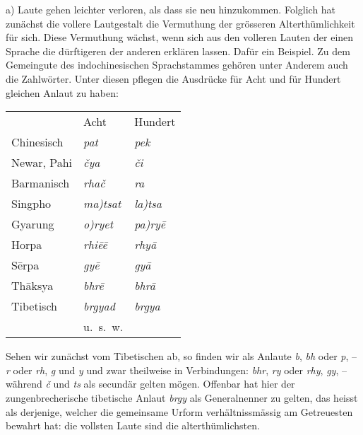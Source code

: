\largerpage[1]\label{III.I.I.2B1a}a) Laute gehen leichter verloren, als dass sie neu hinzukommen. Folglich hat zunächst die vollere Lautgestalt die Vermuthung der grösseren Alterthümlichkeit für sich. Diese Vermuthung wächst, wenn sich aus den volleren Lauten der einen Sprache die dürftigeren der anderen erklären lassen. Dafür ein Beispiel. \label{sp.157} Zu dem Gemeingute des indochine\label{fp.167}sischen Sprachstammes gehören unter Anderem auch die Zahlwörter. Unter diesen pflegen die Ausdrücke für Acht und für Hundert gleichen Anlaut zu haben:

\begin{table}[h]
\centering
\begin{tabular}{ l l l}
 & Acht & Hundert \\
Chinesisch & \textit{pat} & \textit{pek} \\
Newar, Pahi & \textit{čya} & \textit{či} \\
Barmanisch & \textit{rhač} & \textit{ra} \\
Singpho & \textit{ma)tsat} & \textit{la)tsa} \\
Gyarung & \textit{o)ryet} & \textit{pa)ryē} \\
Horpa & \textit{rhiēē} & \textit{rhyā} \\
Sērpa & \textit{gyē} & \textit{gyā} \\
Thāksya & \textit{bhrē} & \textit{bhrā} \\
Tibetisch & \textit{brgyad} & \textit{brgya} \\
 & u.~s.~w. & \\
\end{tabular}
\end{table}

\noindent Sehen wir zunächst vom Tibetischen ab, so finden wir als Anlaute \textit{b}, \textit{bh} oder \textit{p}, – \textit{r} oder \textit{rh}, \textit{g} und \textit{y} und zwar theilweise in Verbindungen: \textit{bhr}, \textit{ry} oder \textit{rhy}, \textit{gy}, – während \textit{č} und \textit{ts} als secundär gelten mögen. Offenbar hat hier der zungenbrecherische tibetische Anlaut \textit{brgy} als Generalnenner zu gelten, das heisst als derjenige, welcher die gemeinsame Urform verhältnissmässig am Getreuesten bewahrt hat: die vollsten Laute sind die alterthümlichsten.

